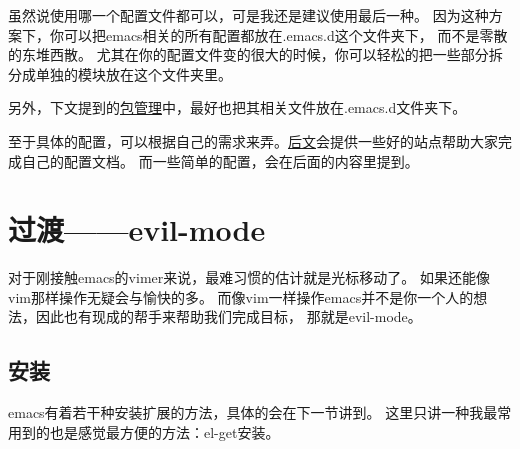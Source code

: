\documentclass{article}
\begin{document}
虽然说使用哪一个配置文件都可以，可是我还是建议使用最后一种。
因为这种方案下，你可以把emacs相关的所有配置都放在.emacs.d这个文件夹下，
而不是零散的东堆西散。
尤其在你的配置文件变的很大的时候，你可以轻松的把一些部分拆分成单独的模块放在这个文件夹里。

另外，下文提到的\hyperref[package-management]{包管理}中，最好也把其相关文件放在.emacs.d文件夹下。

至于具体的配置，可以根据自己的需求来弄。\hyperref[documents]{后文}会提供一些好的站点帮助大家完成自己的配置文档。
而一些简单的配置，会在后面的内容里提到。
\section{过渡——evil-mode}
\label{sec-6}
对于刚接触emacs的vimer来说，最难习惯的估计就是光标移动了。
如果还能像vim那样操作无疑会与愉快的多。
而像vim一样操作emacs并不是你一个人的想法，因此也有现成的帮手来帮助我们完成目标，
那就是evil-mode。
\subsection{安装}
\label{sec-6-1}
emacs有着若干种安装扩展的方法，具体的会在下一节讲到。
这里只讲一种我最常用到的也是感觉最方便的方法：el-get安装。
\end{document}
